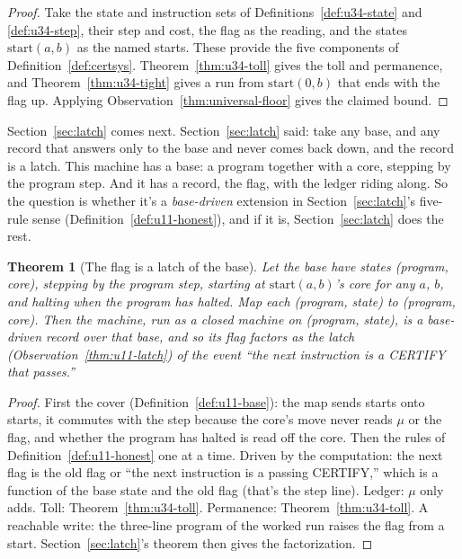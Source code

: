 \documentclass[11pt,twoside]{article}
\theoremstyle{thielethm}
\newtheorem{theorem}{Theorem}[section]
\theoremstyle{thieledef}
\theoremstyle{thieledef}
\theoremstyle{thieledef}
\theoremstyle{thielethm}
\theoremstyle{thieleobs}
\theoremstyle{thielethm}
\begin{document}
\begin{proof}
Take the state and instruction sets of Definitions~\ref{def:u34-state} and
\ref{def:u34-step}, their step and cost, the flag as the reading, and the states
$\mathrm{start}(a, b)$ as the named starts. These provide the five components of
Definition~\ref{def:certsys}. Theorem~\ref{thm:u34-toll} gives the toll and permanence, and
Theorem~\ref{thm:u34-tight} gives a run from $\mathrm{start}(0, b)$ that ends with the flag up.
Applying Observation~\ref{thm:universal-floor} gives the claimed bound.
\end{proof}

Section~\ref{sec:latch} comes next. Section~\ref{sec:latch} said: take any base, and any record that answers only to the base and never
comes back down, and the record is a latch. This machine has a base: a program together
with a core, stepping by the program step. And it has a record, the flag, with the ledger
riding along. So the question is whether it's a \emph{base-driven} extension in Section~\ref{sec:latch}'s five-rule
sense (Definition~\ref{def:u11-honest}), and if it is, Section~\ref{sec:latch} does the rest.

\begin{theorem}[The flag is a latch of the base]\label{thm:u34-latch}
Let the base have states (program, core), stepping by the program step, starting at
$\mathrm{start}(a, b)$'s core for any $a$, $b$, and halting when the program has halted.
Map each (program, state) to (program, core). Then the machine, run as a closed machine on
(program, state), is a base-driven record over that base, and so its flag factors as the latch
(Observation~\ref{thm:u11-latch}) of the event ``the next instruction is a CERTIFY that passes.''
\end{theorem}

\begin{proof}
First the cover (Definition~\ref{def:u11-base}): the map sends starts onto starts, it commutes with
the step because the core's move never reads $\mu$ or the flag, and whether the program has halted
is read off the core. Then the rules of Definition~\ref{def:u11-honest} one at a time. Driven by the computation: the
next flag is the old flag or ``the next instruction is a passing CERTIFY,'' which is a
function of the base state and the old flag (that's the step line). Ledger: $\mu$ only adds.
Toll: Theorem~\ref{thm:u34-toll}. Permanence: Theorem~\ref{thm:u34-toll}. A reachable write: the
three-line program of the worked run raises the flag from a start. Section~\ref{sec:latch}'s theorem then gives
the factorization.
\end{proof}
\end{document}
